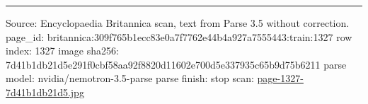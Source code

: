 \documentclass[10pt]{article}
\begin{document}
\vfill\par\noindent\rule{\linewidth}{0.4pt}\par
{\scriptsize\color{gray}\noindent Source: Encyclopaedia Britannica scan, text from Parse 3.5 without correction. page\_id: britannica:309f765b1ecc83e0a7f7762e44b4a927a7555443:train:1327 \quad row index: 1327 \quad image sha256: 7d41b1db21d5e291f0cbf58aa92f8820d11602e700d5e337935c65b9d75b6211 \quad parse model: nvidia/nemotron-3.5-parse \quad parse finish: stop \quad scan: \href{../scans/page-1327-7d41b1db21d5.jpg}{page-1327-7d41b1db21d5.jpg}\par}
\end{document}
